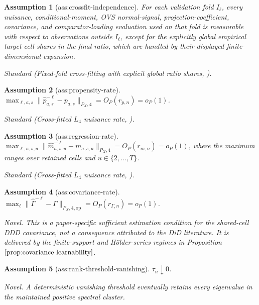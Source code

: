 \documentclass{article}
\newtheorem{assumption}{Assumption}
\begin{document}
\begin{assumption}[ass:crossfit-independence]\label{ass:crossfit-independence}
For each validation fold \(I_\ell\), every nuisance, conditional-moment, OVS normal-signal, projection-coefficient, covariance, and comparator-loading evaluation used on that fold is measurable with respect to observations outside \(I_\ell\), except for the explicitly global empirical target-cell shares in the final ratio, which are handled by their displayed finite-dimensional expansion.
\par\smallskip\noindent\emph{Standard} (Fixed-fold cross-fitting with explicit global ratio shares, \cite{ChernozhukovEtAl2018DML}).
\end{assumption}

\begin{assumption}[ass:propensity-rate]\label{ass:propensity-rate}
\(\max_{\ell,a,s}\|\widehat p^{-\ell}_{a,s}-p_{a,s}\|_{P_X,4}=O_P(r_{p,n})=o_P(1)\).
\par\smallskip\noindent\emph{Standard} (Cross-fitted \(L_4\) nuisance rate, \cite{ChernozhukovEtAl2018DML}).
\end{assumption}

\begin{assumption}[ass:regression-rate]\label{ass:regression-rate}
\(\max_{\ell,a,s,u}\|\widehat m^{-\ell}_{a,s,u}-m_{a,s,u}\|_{P_X,4}=O_P(r_{m,n})=o_P(1)\), where the maximum ranges over retained cells and \(u\in\{2,\ldots,T\}\).
\par\smallskip\noindent\emph{Standard} (Cross-fitted \(L_4\) nuisance rate, \cite{ChernozhukovEtAl2018DML}).
\end{assumption}

\begin{assumption}[ass:covariance-rate]\label{ass:covariance-rate}
\(\max_{\ell}\|\widehat\Gamma^{-\ell}-\Gamma\|_{P_X,4,\mathrm{op}}=O_P(r_{\Gamma,n})=o_P(1)\).
\par\smallskip\noindent\emph{Novel.} This is a paper-specific sufficient estimation condition for the shared-cell DDD covariance, not a consequence attributed to the DiD literature. It is delivered by the finite-support and Hölder-series regimes in Proposition \(\ref{prop:covariance-learnability}\).
\end{assumption}

\begin{assumption}[ass:rank-threshold-vanishing]\label{ass:rank-threshold-vanishing}
\(\tau_n\downarrow0\).
\par\smallskip\noindent\emph{Novel.} A deterministic vanishing threshold eventually retains every eigenvalue in the maintained positive spectral cluster.
\end{assumption}
\end{document}
